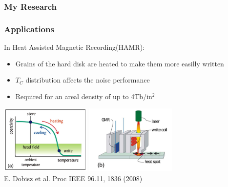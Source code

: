 \documentclass{beamer}
\begin{document}
\begin{frame}
	\frametitle{My Research}
	
\end{frame}

\begin{frame}
	\frametitle{Applications}
	In Heat Assisted Magnetic Recording(HAMR)\footnotemark[1]:
	\begin{itemize}
		\item{Grains of the hard disk are heated to make them more easilly written}
		\item{$T_C$ distribution affects the noise performance}
		\item{Required for an areal density of up to 4Tb/in$^2$}
	\end{itemize} \vspace{5mm}
		
	\begin{center}
	\includegraphics[width=4.5cm]{Images/coerc} \hspace{2mm}
	\includegraphics[width=4.5cm]{Images/laser} \\
	\tiny E. Dobisz et al. Proc IEEE 96.11, 1836 (2008)
	\end{center}
\end{frame}
\end{document}
